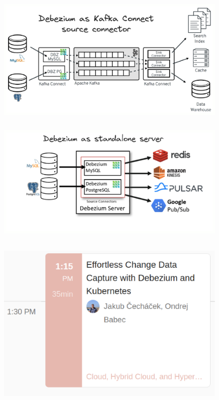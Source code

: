 \documentclass[10pt,utf8]{beamer}
\begin{document}
\begin{frame}
    \begin{figure}
        \centering
        \includegraphics[height=6cm]{./img/debezium_kafka.eps}
    \end{figure}
\end{frame}    
    
\begin{frame}
    \begin{figure}
        \centering
        \includegraphics[height=6cm]{./img/debezium_server.eps}
    \end{figure}
\end{frame}    

\begin{frame}
    \begin{figure}
        \centering
        \includegraphics[height=8cm]{./img/dbz_k8s_talk.eps}
    \end{figure}
\end{frame}
\end{document}
